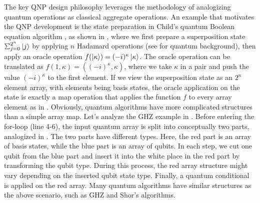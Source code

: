The key QNP design philosophy leverages the methodology of analogizing quantum operations as classical aggregate operations.
An example that motivates the QNP development is the state preparation in Child's quantum Boolean equation algorithm \cite{ChildsNAND}, as shown in ,
where we first prepare a superposition state $\Msum_{j=0}^{2^n}\ket{j}$  by applying $n$ Hadamard operations (see  for quantum background), then apply an oracle operation $f(\left\vert{\kappa}\right\rangle)=(-i)^{\kappa}\left\vert{\kappa}\right\rangle$.
The oracle operation can be translated as $f(1,\kappa)=((-i)^{\kappa},\kappa)$,  where we take $\kappa$ in a pair and push the value $(-i)^{\kappa}$ to the first element.
If we view the superposition state as an $2^n$ element array, with elements being basis states, the oracle application on the state is exactly a map operation that applies the function $f$ to every array element as in .
Obviously, quantum algorithms have more complicated structures than a simple array map.
Let's analyze the GHZ example in . Before entering the for-loop (line 4-6), the input quantum array is split into conceptually two parts, analogized in . 
The two parts have different types. Here, the red part is an array of basis states, while the blue part is an array of qubits.
In each step, we cut one qubit from the blue part and insert it into the white place in the red part by transforming the qubit type.
During this process, the red array structure might vary depending on the inserted qubit state type.
Finally, a quantum conditional is applied on the red array.
Many quantum algorithms have similar structures as the above scenario, such as GHZ \cite{Greenberger1989} and Shor's algorithms. 

